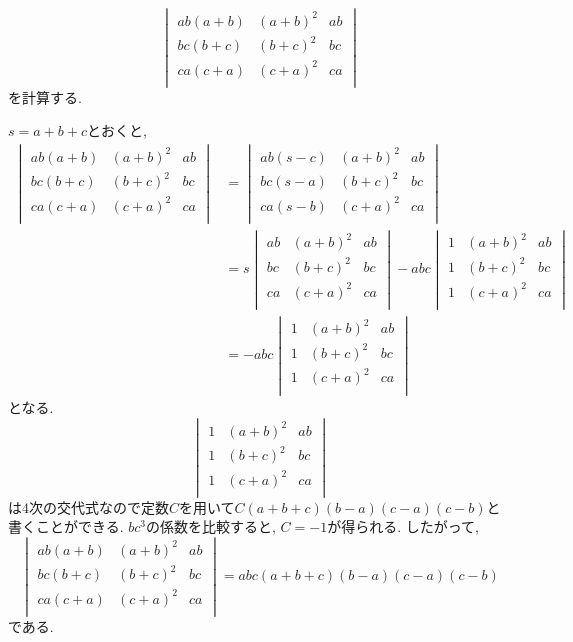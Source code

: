 \begin{eg}\label{eg:det_322}
\[\begin{vmatrix}
ab(a+b)&(a+b)^2&ab\\
bc(b+c)&(b+c)^2&bc\\
ca(c+a)&(c+a)^2&ca\\
\end{vmatrix}\]
を計算する.

$s=a+b+c$とおくと,
\begin{align*}
\begin{vmatrix}
ab(a+b)&(a+b)^2&ab\\
bc(b+c)&(b+c)^2&bc\\
ca(c+a)&(c+a)^2&ca\\
\end{vmatrix}
&=
\begin{vmatrix}
ab(s-c)&(a+b)^2&ab\\
bc(s-a)&(b+c)^2&bc\\
ca(s-b)&(c+a)^2&ca\\
\end{vmatrix}\\
&=s\begin{vmatrix}
ab&(a+b)^2&ab\\
bc&(b+c)^2&bc\\
ca&(c+a)^2&ca\\
\end{vmatrix}
-abc\begin{vmatrix}
1&(a+b)^2&ab\\
1&(b+c)^2&bc\\
1&(c+a)^2&ca\\
\end{vmatrix}\\
&=-abc\begin{vmatrix}
1&(a+b)^2&ab\\
1&(b+c)^2&bc\\
1&(c+a)^2&ca\\
\end{vmatrix}
\end{align*}
となる.
\[\begin{vmatrix}
1&(a+b)^2&ab\\
1&(b+c)^2&bc\\
1&(c+a)^2&ca\\
\end{vmatrix}\]
は$4$次の交代式なので定数$C$を用いて$C(a+b+c)(b-a)(c-a)(c-b)$と書くことができる.
$bc^3$の係数を比較すると, $C=-1$が得られる.
したがって,
\[\begin{vmatrix}
ab(a+b)&(a+b)^2&ab\\
bc(b+c)&(b+c)^2&bc\\
ca(c+a)&(c+a)^2&ca\\
\end{vmatrix}
=abc(a+b+c)(b-a)(c-a)(c-b)\]
である.
\end{eg}
